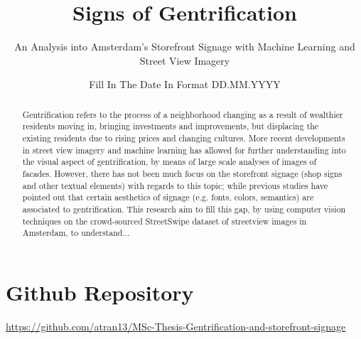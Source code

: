 \documentclass[ds, nofrontpicture, nofirstcompanypicture, nosecondcompanypicture]{mscthesis}
\title{Signs of Gentrification}
\subtitle{An Analysis into Amsterdam's Storefront Signage with Machine Learning and Street View Imagery}
\date{Fill In The Date In Format DD.MM.YYYY}
\begin{document}
\pagestyle{plain}
\setcounter{page}{1}

\maketitlepage
\fixemptypage

\begin{abstract}
Gentrification refers to the process of a neighborhood changing as a result of wealthier residents moving in, bringing investments and improvements, but displacing the existing residents due to rising prices and changing cultures. More recent developments in street view imagery and machine learning has allowed for further understanding into the visual aspect of gentrification, by means of large scale analyses of images of facades. However, there has not been much focus on the storefront signage (shop signs and other textual elements) with regards to this topic; while previous studies have pointed out that certain aesthetics of signage (e.g. fonts, colors, semantics) are associated to gentrification. This research aim to fill this gap, by using computer vision techniques on the crowd-sourced StreetSwipe dataset of streetview images in Amsterdam, to understand...
\end{abstract}

\maketitle

\section*{Github Repository}
\url{https://github.com/atran13/MSc-Thesis-Gentrification-and-storefront-signage}












\newpage

\end{document}
